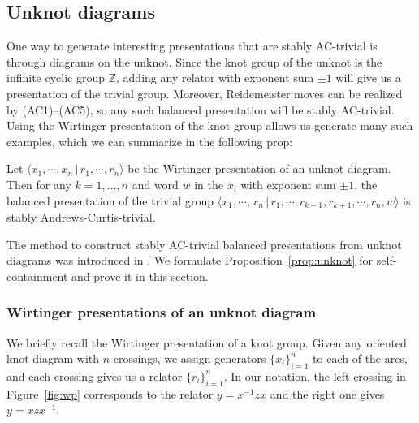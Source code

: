 \subsection{Unknot diagrams}

One way to generate interesting presentations that are stably AC-trivial is through diagrams on the unknot. Since the knot group of the unknot is the infinite cyclic group $\mathbb{Z}$, adding any relator with exponent sum $\pm 1$ will give us a presentation of the trivial group. Moreover, Reidemeister moves can be realized by (AC1)–(AC5), so any such balanced presentation will be stably AC-trivial. Using the Wirtinger presentation of the knot group allows us generate many such examples, which we can summarize in the following prop:

\begin{proposition}\label{prop:unknot}
    Let $\langle x_1,\cdots, x_n\, |\, r_1, \cdots, r_n \rangle$ be the Wirtinger presentation of an unknot diagram. Then for any $k=1,\ldots,n$ and word $w$ in the $x_i$ with exponent sum $\pm 1$, the balanced presentation of the trivial group $\langle x_1,\cdots, x_n\,|\, r_1,\cdots, r_{k-1}, r_{k+1},\cdots, r_n, w\rangle$ is stably Andrews-Curtis-trivial.
\end{proposition}
\begin{remark}
The method to construct stably AC-trivial balanced presentations from unknot diagrams was introduced in \cite{MMS}.  We formulate Proposition~\ref{prop:unknot} for self-containment and prove it in this section.
\end{remark}

\subsubsection{Wirtinger presentations of an unknot diagram}
We briefly recall the Wirtinger presentation of a knot group. Given any oriented knot diagram with $n$ crossings, we assign generators $\{x_i\}_{i=1}^n$ to each of the arcs, and each crossing gives us a relator $\{r_i\}_{i=1}^n$. In our notation, the left crossing in Figure~\ref{fig:wp} corresponds to the relator $y=x^{-1}zx$ and the right one gives $y=xzx^{-1}$.

